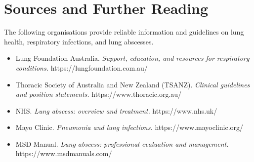 \section*{Sources and Further Reading}
The following organisations provide reliable information and guidelines on lung health, respiratory infections, and lung abscesses.
\begin{itemize}
    \item Lung Foundation Australia. \textit{Support, education, and resources for respiratory conditions.} https://lungfoundation.com.au/
    \item Thoracic Society of Australia and New Zealand (TSANZ). \textit{Clinical guidelines and position statements.} https://www.thoracic.org.au/
    \item NHS. \textit{Lung abscess: overview and treatment.} https://www.nhs.uk/
    \item Mayo Clinic. \textit{Pneumonia and lung infections.} https://www.mayoclinic.org/
    \item MSD Manual. \textit{Lung abscess: professional evaluation and management.} https://www.msdmanuals.com/
\end{itemize}
